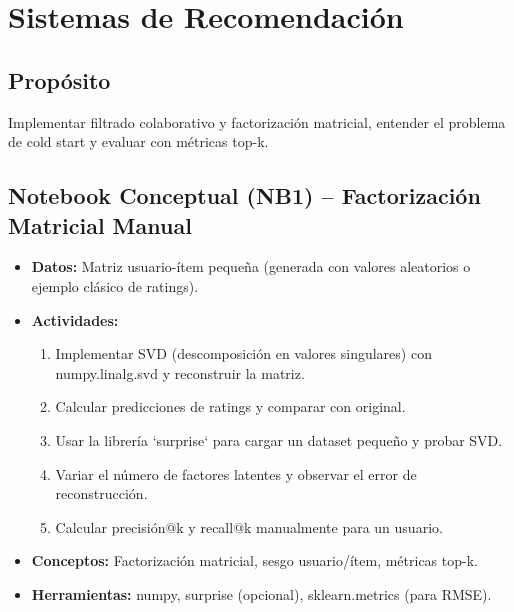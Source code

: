 \documentclass[12pt,a4paper]{article}
\begin{document}
\section{Sistemas de Recomendación}
\subsection*{Propósito}
Implementar filtrado colaborativo y factorización matricial, entender el problema de cold start y evaluar con métricas top-k.

\subsection*{Notebook Conceptual (NB1) – Factorización Matricial Manual}
\begin{itemize}
    \item \textbf{Datos:} Matriz usuario-ítem pequeña (generada con valores aleatorios o ejemplo clásico de ratings).
    \item \textbf{Actividades:}
    \begin{enumerate}
        \item Implementar SVD (descomposición en valores singulares) con numpy.linalg.svd y reconstruir la matriz.
        \item Calcular predicciones de ratings y comparar con original.
        \item Usar la librería `surprise` para cargar un dataset pequeño y probar SVD.
        \item Variar el número de factores latentes y observar el error de reconstrucción.
        \item Calcular precisión@k y recall@k manualmente para un usuario.
    \end{enumerate}
    \item \textbf{Conceptos:} Factorización matricial, sesgo usuario/ítem, métricas top-k.
    \item \textbf{Herramientas:} numpy, surprise (opcional), sklearn.metrics (para RMSE).
\end{itemize}
\end{document}
